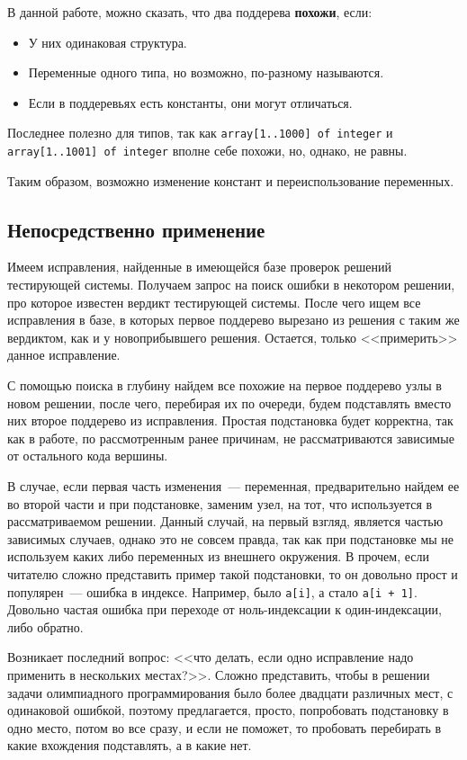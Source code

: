 В данной работе, можно сказать, что два поддерева \textbf{похожи}, если:
\begin{itemize}
    \item У них одинаковая структура.
    \item Переменные одного типа, но возможно, по-разному называются.
    \item Если в поддеревьях есть константы, они могут отличаться.
\end{itemize}
Последнее полезно для типов, так как \texttt{array[1..1000] of integer} и \texttt{array[1..1001] of integer} вполне себе похожи,
но, однако, не равны.

Таким образом, возможно изменение констант и переиспользование переменных.

\subsection{Непосредственно применение}
Имеем исправления, найденные в имеющейся базе проверок решений тестирующей системы. Получаем запрос на поиск ошибки
в некотором решении, про которое известен вердикт тестирующей системы. После чего ищем все исправления в базе, 
в которых первое поддерево вырезано из решения с таким же вердиктом, как и у новоприбывшего решения. Остается, только
<<примерить>> данное исправление.

С помощью поиска в глубину найдем все похожие на первое поддерево узлы в новом решении, после чего, перебирая их по очереди,
будем подставлять вместо них второе поддерево из исправления. Простая подстановка будет корректна, так как в работе, по рассмотренным
ранее причинам, не рассматриваются зависимые от остального кода вершины. 

В случае, если первая часть изменения~--- переменная, предварительно найдем ее во второй части и при подстановке, заменим узел, на тот,
что используется в рассматриваемом решении. Данный случай, на первый взгляд, является частью зависимых случаев, однако это не совсем
правда, так как при подстановке мы не используем каких либо переменных из внешнего окружения. В прочем, если читателю
сложно представить пример такой подстановки, то он довольно прост и популярен~--- ошибка в индексе. Например, было
\texttt{a[i]}, а стало \texttt{a[i + 1]}. Довольно частая ошибка при переходе от ноль-индексации к один-индексации, либо обратно.

Возникает последний вопрос: <<что делать, если одно исправление надо применить в нескольких местах?>>.
Сложно представить, чтобы в решении задачи олимпиадного программирования было более двадцати различных мест, с одинаковой
ошибкой, поэтому предлагается, просто, попробовать подстановку в одно место, потом во все сразу, и если не поможет, то пробовать
перебирать в какие вхождения подставлять, а в какие нет. 

